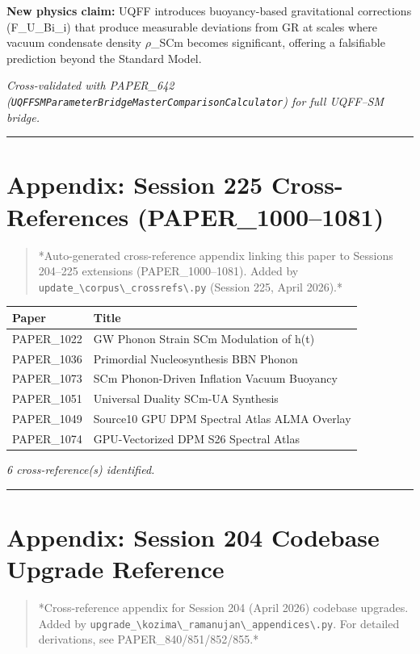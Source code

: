 \documentclass[12pt,a4paper]{article}
\begin{document}
\textbf{New physics claim:} UQFF introduces buoyancy-based gravitational corrections (F\_{U\_Bi\_i}) that produce measurable deviations from GR at scales where vacuum condensate density $\rho$\_SCm becomes significant, offering a falsifiable prediction beyond the Standard Model.

\emph{Cross-validated with PAPER\_642 (\texttt{UQFFSMParameterBridgeMasterComparisonCalculator}) for full UQFF--SM bridge.}

\medskip\hrule\medskip

\section{Appendix: Session 225 Cross-References (PAPER\_1000--1081)}

\begin{quote}
*Auto-generated cross-reference appendix linking this paper to
Sessions 204--225 extensions (PAPER\_1000--1081). Added by
\texttt{update\_\textbackslash {corpus\textbackslash \_crossrefs\textbackslash }.py} (Session 225, April 2026).*
\end{quote}

\begin{table}[H]
\centering
\small
\begin{tabularx}{\linewidth}{@{}>{\raggedright\arraybackslash}X>{\raggedright\arraybackslash}X@{}}
\toprule
Paper & Title \tabularnewline
\midrule
PAPER\_1022 & GW Phonon Strain SCm Modulation of h(t) \tabularnewline
PAPER\_1036 & Primordial Nucleosynthesis BBN Phonon \tabularnewline
PAPER\_1073 & SCm Phonon-Driven Inflation Vacuum Buoyancy \tabularnewline
PAPER\_1051 & Universal Duality SCm-UA Synthesis \tabularnewline
PAPER\_1049 & Source10 GPU DPM Spectral Atlas ALMA Overlay \tabularnewline
PAPER\_1074 & GPU-Vectorized DPM S26 Spectral Atlas \tabularnewline
\bottomrule
\end{tabularx}
\end{table}

\emph{6 cross-reference(s) identified.}

\medskip\hrule\medskip

\section{Appendix: Session 204 Codebase Upgrade Reference}

\begin{quote}
*Cross-reference appendix for Session 204 (April 2026) codebase upgrades.
Added by \texttt{upgrade\_\textbackslash {kozima\textbackslash \_ramanujan\textbackslash \_appendices\textbackslash }.py}. For detailed derivations,
see PAPER\_840/851/852/855.*
\end{quote}
\end{document}
